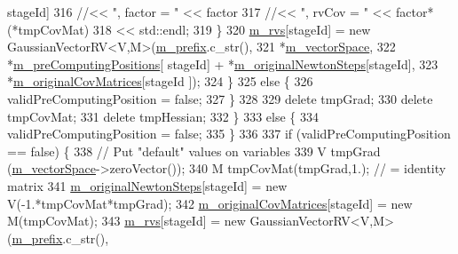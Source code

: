 \begin{DoxyCode}
      stageId]
316                              \textcolor{comment}{//<< ", factor = "          << factor}
317                              \textcolor{comment}{//<< ", rvCov = "           << factor*(*tmpCovMat)}
318                                << std::endl;
319       \}
320       \hyperlink{class_q_u_e_s_o_1_1_base_t_k_group_a87c6b02ea45ab3de634c22afa58f53a5}{m\_rvs}[stageId] = \textcolor{keyword}{new} GaussianVectorRV<V,M>(\hyperlink{class_q_u_e_s_o_1_1_base_t_k_group_a7c77e4969de60624dba1049cf44a1ab6}{m\_prefix}.c\_str(),
321                                                         *\hyperlink{class_q_u_e_s_o_1_1_base_t_k_group_a9930bbda0f3d9368653fb0577b89ec33}{m\_vectorSpace},
322                                                         *\hyperlink{class_q_u_e_s_o_1_1_base_t_k_group_a93d7fe55e30a7c6f209b01cb8a67e322}{m\_preComputingPositions}[
      stageId] + *\hyperlink{class_q_u_e_s_o_1_1_hessian_cov_matrices_t_k_group_a4c0fe3171a35cdd453a4e23e1438ddf9}{m\_originalNewtonSteps}[stageId],
323                                                         *\hyperlink{class_q_u_e_s_o_1_1_hessian_cov_matrices_t_k_group_acc7219917faf933e77694894856fa646}{m\_originalCovMatrices}[stageId
      ]);
324     \}
325     \textcolor{keywordflow}{else} \{
326       validPreComputingPosition = \textcolor{keyword}{false};
327     \}
328 
329     \textcolor{keyword}{delete} tmpGrad;
330     \textcolor{keyword}{delete} tmpCovMat;
331     \textcolor{keyword}{delete} tmpHessian;
332   \}
333   \textcolor{keywordflow}{else} \{
334     validPreComputingPosition = \textcolor{keyword}{false};
335   \}
336 
337   \textcolor{keywordflow}{if} (validPreComputingPosition == \textcolor{keyword}{false}) \{
338     \textcolor{comment}{// Put "default" values on variables}
339     V tmpGrad  (\hyperlink{class_q_u_e_s_o_1_1_base_t_k_group_a9930bbda0f3d9368653fb0577b89ec33}{m\_vectorSpace}->zeroVector());
340     M tmpCovMat(tmpGrad,1.); \textcolor{comment}{// = identity matrix}
341     \hyperlink{class_q_u_e_s_o_1_1_hessian_cov_matrices_t_k_group_a4c0fe3171a35cdd453a4e23e1438ddf9}{m\_originalNewtonSteps}[stageId] = \textcolor{keyword}{new} V(-1.*tmpCovMat*tmpGrad);
342     \hyperlink{class_q_u_e_s_o_1_1_hessian_cov_matrices_t_k_group_acc7219917faf933e77694894856fa646}{m\_originalCovMatrices}[stageId] = \textcolor{keyword}{new} M(tmpCovMat);
343     \hyperlink{class_q_u_e_s_o_1_1_base_t_k_group_a87c6b02ea45ab3de634c22afa58f53a5}{m\_rvs}[stageId] = \textcolor{keyword}{new} GaussianVectorRV<V,M>(\hyperlink{class_q_u_e_s_o_1_1_base_t_k_group_a7c77e4969de60624dba1049cf44a1ab6}{m\_prefix}.c\_str(),

\end{DoxyCode}
